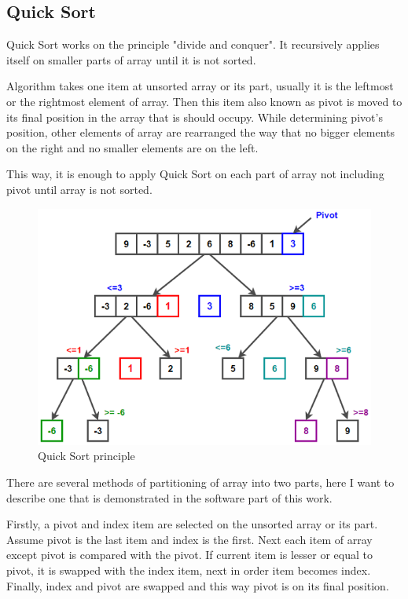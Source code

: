 \documentclass[
  field=inf,
  biblatex,
  language=english,
  glossaries,
  index
]{kidiplom}
\begin{document}
\subsection{Quick Sort}

Quick Sort works on the principle "divide and conquer". It recursively applies itself on smaller parts of array until it is not sorted.

Algorithm takes one item at unsorted array or its part, usually it is the leftmost or the rightmost element of array. Then this item also known as pivot is moved to its final position in the array that is should occupy. While determining pivot's position, other elements of array are rearranged the way that no bigger elements on the right and no smaller elements are on the left.

This way, it is enough to apply Quick Sort on each part of array not including pivot until array is not sorted.

\begin{figure}[H]
\begin{center}
	
	\includegraphics[scale=0.7]{img/Quicksort.png}
	\caption{Quick Sort principle}\label{fig:insert}
\end{center}
\end{figure}

There are several methods of partitioning of array into two parts, here I want to describe one that is demonstrated in the software part of this work.

Firstly, a pivot and index item are selected on the unsorted array or its part. Assume pivot is the last item and index is the first. Next each item of array except pivot is compared with the pivot. If current item is lesser or equal to pivot, it is swapped with the index item, next in order item becomes index. Finally, index and pivot are swapped and this way pivot is on its final position.
\end{document}
